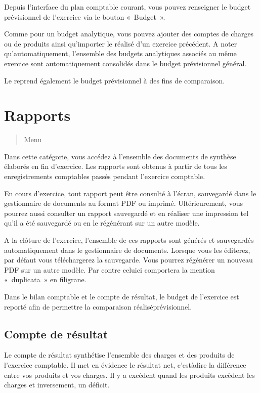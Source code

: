\documentclass[a4paper,10pt,oneside,french]{sphinxmanual}
\begin{document}
\sphinxAtStartPar
Depuis l’interface du plan comptable courant, vous pouvez renseigner le budget prévisionnel de l’exercice via le bouton « Budget ».

\sphinxAtStartPar
Comme pour un budget analytique, vous pouvez ajouter des comptes de charges ou de produits ainsi qu’importer le réalisé d’un exercice précédent.
A noter qu’automatiquement, l’ensemble des budgets analytiques associés au même exercice sont automatiquement consolidés dans le budget prévisionnel général.

\sphinxAtStartPar
Le  reprend également le budget prévisionnel à des fins de comparaison.

\sphinxstepscope


\section{Rapports}
\label{\detokenize{accounting/reporting:rapports}}\label{\detokenize{accounting/reporting::doc}}\begin{quote}

\sphinxAtStartPar
Menu 
\end{quote}

\sphinxAtStartPar
Dans cette catégorie, vous accédez à l’ensemble des documents de synthèse élaborés en fin d’exercice. Les rapports sont obtenus à partir de tous les enregistrements comptables passés pendant l’exercice comptable.

\sphinxAtStartPar
En cours d’exercice, tout rapport peut être consulté à l’écran, sauvegardé dans le gestionnaire de documents au format PDF ou imprimé. Ultérieurement, vous pourrez aussi consulter un rapport sauvegardé et en réaliser une impression tel qu’il a été sauvegardé ou en le régénérant sur un autre modèle.

\sphinxAtStartPar
A la clôture de l’exercice, l’ensemble de ces rapports sont générés et sauvegardés automatiquement dans le gestionnaire de documents. Lorsque vous les éditerez, par défaut vous téléchargerez la sauvegarde. Vous pourrez régénérer un nouveau PDF sur un autre modèle. Par contre celui\sphinxhyphen{}ci comportera la mention « duplicata » en filigrane.

\sphinxAtStartPar
Dans le bilan comptable et le compte de résultat, le budget de l’exercice est reporté afin de permettre la comparaison réalisé\sphinxhyphen{}prévisionnel.


\subsection{Compte de résultat}
\label{\detokenize{accounting/reporting:compte-de-resultat}}
\sphinxAtStartPar
Le compte de résultat  synthétise l’ensemble des charges et des produits de l’exercice comptable.
Il met en évidence le résultat net, c’est\sphinxhyphen{}à\sphinxhyphen{}dire la différence entre vos produits et vos charges. Il y a excédent quand les produits excèdent les charges et inversement, un déficit.
\end{document}
